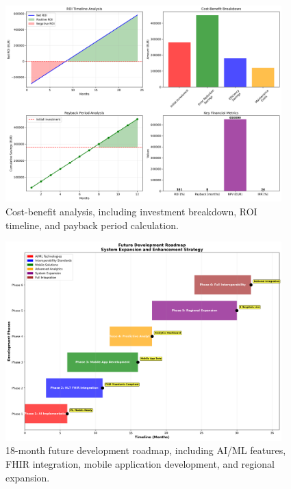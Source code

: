 \begin{figure}[htbp]
    \centering
    \includegraphics[width=0.95\textwidth]{images/generated/roi_analysis.png}
    \caption{Cost-benefit analysis, including investment breakdown, ROI timeline, and payback period calculation.}
    \label{fig:roi-analysis}
\end{figure}

\begin{figure}[htbp]
    \centering
    \includegraphics[width=0.95\textwidth]{images/generated/future_roadmap.png}
    \caption{18-month future development roadmap, including AI/ML features, FHIR integration, mobile application development, and regional expansion.}
    \label{fig:future-roadmap}
\end{figure} 